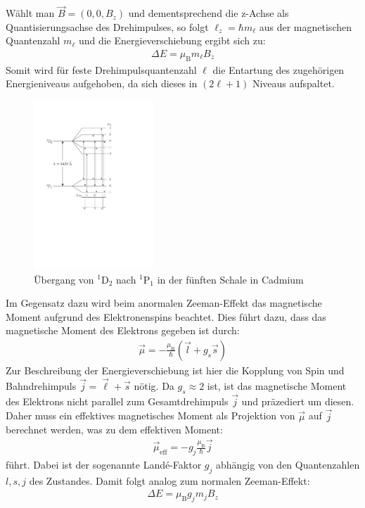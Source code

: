 \documentclass[11pt, a4paper]{article}
\begin{document}
Wählt man $\vec{B} = (0,0,B_z)$ und dementsprechend die z-Achse als Quantisierungsachse des Drehimpulses, so folgt $\ell_z = \hbar m_\ell$ aus der magnetischen Quantenzahl $m_\ell$ und die Energieverschiebung ergibt sich zu:
\begin{align}
	\Delta E = \mu_\mathrm{B} m_\ell B_z
	\label{eq:normaler_zeeman}
\end{align}
Somit wird für feste Drehimpulsquantenzahl $\ell$ die Entartung des zugehörigen Energieniveaus aufgehoben, da sich dieses in $(2\ell + 1)$ Niveaus aufspaltet.
\begin{figure}[h]
\centering
\includegraphics[width=0.4\textwidth]{./figures/termschema_cadmium.pdf}
\caption{Übergang von $^1$D$_2$ nach $^1$P$_1$ in der fünften Schale in Cadmium}
\label{fig:termschema_cadmium}
\end{figure}
Im Gegensatz dazu wird beim anormalen Zeeman-Effekt das magnetische Moment aufgrund des Elektronenspins beachtet.
Dies führt dazu, dass das magnetische Moment des Elektrons gegeben ist durch:
\begin{align}
\vec{\mu} = -\frac{\mu_\mathrm{B}}{\hbar} \left( \vec{l} + g_s \vec{s} \right)
\label{eq:magmom_spin}
\end{align}
Zur Beschreibung der Energieverschiebung ist hier die Kopplung von Spin und Bahndrehimpuls $\vec{j} = \vec{\ell} + \vec{s}$ nötig.
Da $g_s \approx 2$ ist, ist das magnetische Moment des Elektrons nicht parallel zum Gesamtdrehimpuls $\vec{j}$ und präzediert um diesen.
Daher muss ein effektives magnetisches Moment als Projektion von $\vec{\mu}$ auf $\vec{j}$ berechnet werden, was zu dem effektiven Moment:
\begin{align*}
	\vec{\mu}_\mathrm{eff} = - g_j \frac{\mu_\mathrm{B}}{\hbar} \vec{j} 
\end{align*}
führt.
Dabei ist der sogenannte Landé-Faktor $g_j$ abhängig von den Quantenzahlen $l,s,j$ des Zustandes.
Damit folgt analog zum normalen Zeeman-Effekt:
\begin{align}
	\Delta E = \mu_\mathrm{B} g_j m_j B_z
\end{align}
\end{document}

